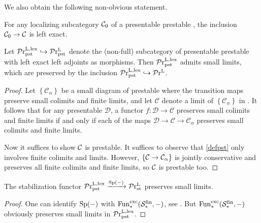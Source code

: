 \documentclass[a4paper,10pt, oneside]{amsart}
\begin{document}
	We also obtain the following non-obvious statement.
	\begin{cor}
		For any localizing subcategory $\mathcal{C}_0$ of a presentable prestable \infcat \mcc, the inclusion $\mathcal{C}_0\to\mathcal{C}$ is left exact.
	\end{cor}
	\begin{prop}\label{limlex}
		Let $\mathcal{P}\mathrm{r}_{\mathrm{pst}}^{\mathrm{L},\mathrm{lex}}\hookrightarrow\mathcal{P}\mathrm{r}^\mathrm{L}_{\mathrm{pst}}$ denote the (non-full) subcategory of presentable prestable \infcats with left exact left adjoints as morphisms. Then $\mathcal{P}\mathrm{r}_{\mathrm{pst}}^{\mathrm{L},\mathrm{lex}}$ admits small limits, which are preserved by the inclusion $\mathcal{P}\mathrm{r}_{\mathrm{pst}}^{\mathrm{L},\mathrm{lex}}\hookrightarrow\mathcal{P}\mathrm{r}^\mathrm{L}$.
	\end{prop}
	\begin{proof}
		Let $\left\{\mathcal{C}_\alpha\right\}$ be a small diagram of prestable \infcats where the transition maps preserve small colimits and finite limits, and let $\mathcal{C}$ denote a limit of $\left\{\mathcal{C}_\alpha\right\}$ in \prl. It follows that for any presentable \infcat $\mathcal{D}$, a functor $f: \mathcal{D} \rightarrow \mathcal{C}$ preserves small colimits and finite limits if and only if each of the maps $\mathcal{D} \rightarrow \mathcal{C} \rightarrow \mathcal{C}_\alpha$ preserves small colimits and finite limits. 
		
		Now it suffices to show $\mathcal{C}$ is prestable. It suffices to observe that \cref{defpst} only involves finite colimits and limits. However, $\{\mathcal{C}\to\mathcal{C}_\alpha\}$ is jointly conservative and preserves all finite colimits and finite limits, so $\mathcal{C}$ is prestable too.%
	\end{proof}
	\begin{prop}
		The stabilization functor $\mathcal{P}\mathrm{r}_{\mathrm{pst}}^{\mathrm{L},\mathrm{lex}}\xrightarrow{\mathrm{Sp}(-)}\mathcal{P}\mathrm{r}_{\mathrm{st}}^\mathrm{L}$ preserves small limits.
	\end{prop}
	\begin{proof}
		One can identify $\mathrm{Sp}(-)$ with $\operatorname{Fun}_*^{\mathrm{exc}}(\mathcal{S}_*^{\mathrm{fin}}, -)$, see \cite[Definition 1.4.2.8]{ha}. But $\operatorname{Fun}_*^{\mathrm{exc}}(\mathcal{S}_*^{\mathrm{fin}}, -)$ obviously preserves small limits in $\mathcal{P}\mathrm{r}_{\mathrm{pst}}^{\mathrm{L},\mathrm{lex}}$.
	\end{proof}
\end{document}
